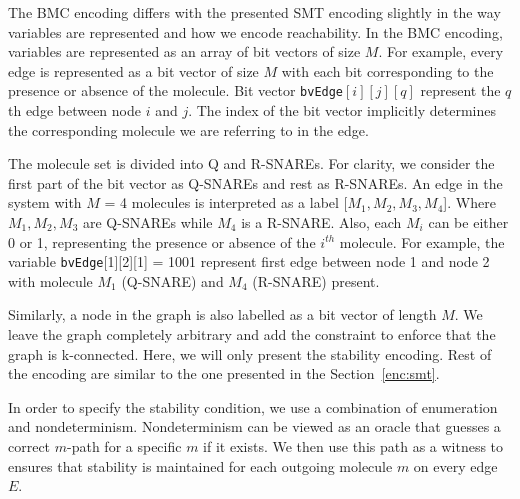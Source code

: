 The BMC encoding differs with the presented SMT encoding slightly in the way variables are represented and how we encode reachability.  
%
In the BMC encoding, variables are represented as an array of bit vectors of size $M$. 
%
%
For example, every edge is represented as a bit vector of size $M$ with each bit corresponding to the presence or absence of the molecule. 
%
Bit vector \texttt{bvEdge}$[i][j][q]$ represent the $q$th edge between node $i$ and $j$.
%
The index of the bit vector implicitly determines the corresponding molecule we are referring to in the edge.
% 

The molecule set is divided into Q and R-SNAREs. 
%
For clarity, we consider the first part of the bit vector as Q-SNAREs and rest as R-SNAREs.
%
An edge in the system with $M$ = 4 molecules is interpreted as a label [$M_{1}, M_{2}, M_{3}, M_{4}$]. 
%
Where $M_{1}, M_{2}, M_{3}$ are Q-SNAREs while $M_{4}$ is a R-SNARE.
%
Also, each $M_i$ can be either 0 or 1, representing the presence or absence of the $i^{th}$ molecule.
%
For example, the variable \texttt{bvEdge}[1][2][1] = 1001 represent first edge between node 1 and node 2 with molecule $M_{1}$ (Q-SNARE) and $M_{4}$ (R-SNARE) present. 

Similarly, a node in the graph is also labelled as a bit vector of length $M$.   
%
We leave the graph completely arbitrary and add the constraint to enforce that the graph is k-connected. 
%
Here, we will only present the stability encoding.  
%
Rest of the encoding are similar to the one presented in the Section~\ref{enc:smt}.

In order to specify the stability condition, we use a combination of enumeration and nondeterminism.
%
Nondeterminism can be viewed as an oracle that guesses a correct $m$-path for a specific $m$ if it exists. 
%
We then use this path as a witness to ensures that stability is maintained for each outgoing molecule $m$ on every edge $E$.
%

